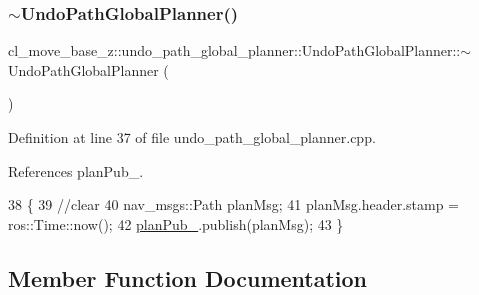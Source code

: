 \subsubsection{\texorpdfstring{$\sim$\+Undo\+Path\+Global\+Planner()}{~UndoPathGlobalPlanner()}}
{\footnotesize\ttfamily cl\+\_\+move\+\_\+base\+\_\+z\+::undo\+\_\+path\+\_\+global\+\_\+planner\+::\+Undo\+Path\+Global\+Planner\+::$\sim$\+Undo\+Path\+Global\+Planner (\begin{DoxyParamCaption}{ }\end{DoxyParamCaption})\hspace{0.3cm}{\ttfamily [virtual]}}



Definition at line 37 of file undo\+\_\+path\+\_\+global\+\_\+planner.\+cpp.



References plan\+Pub\+\_\+.


\begin{DoxyCode}
38         \{
39             \textcolor{comment}{//clear}
40             nav\_msgs::Path planMsg;
41             planMsg.header.stamp = ros::Time::now();
42             \hyperlink{classcl__move__base__z_1_1undo__path__global__planner_1_1UndoPathGlobalPlanner_a65bf364a122d5950baf1bf8b42309d68}{planPub\_}.publish(planMsg);
43         \}
\end{DoxyCode}


\subsection{Member Function Documentation}
\mbox{\label{classcl__move__base__z_1_1undo__path__global__planner_1_1UndoPathGlobalPlanner_a659c16f439d33ac7026a54bb65c26ca8}} 
